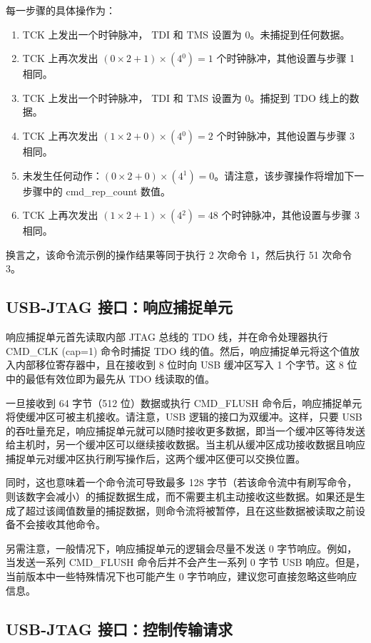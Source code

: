 \documentclass[main\_\_CN.tex]{subfiles}
\begin{document}
每一步骤的具体操作为：

\begin{enumerate}
\item TCK 上发出一个时钟脉冲， TDI 和 TMS 设置为 0。未捕捉到任何数据。
\item TCK 上再次发出 \((0\times2+1)\times(4{^0})=1\) 个时钟脉冲，其他设置与步骤 1 相同。
\item TCK 上发出一个时钟脉冲， TDI 和 TMS 设置为 0。捕捉到 TDO 线上的数据。
\item TCK 上再次发出 \((1\times2+0)\times(4{^0})=2\) 个时钟脉冲，其他设置与步骤 3 相同。
\item 未发生任何动作：\((0\times2+0)\times(4{^1})=0\)。请注意，该步骤操作将增加下一步骤中的 cmd\_rep\_count 数值。
\item TCK 上再次发出 \((1\times2+1)\times(4{^2})=48\) 个时钟脉冲，其他设置与步骤 3 相同。
\end{enumerate}

换言之，该命令流示例的操作结果等同于执行 2 次命令 1，然后执行 51 次命令 3。

\subsection{USB-JTAG 接口：响应捕捉单元}

响应捕捉单元首先读取内部 JTAG 总线的 TDO 线，并在命令处理器执行 CMD\_CLK (cap=1) 命令时捕捉 TDO 线的值。然后，响应捕捉单元将这个值放入内部移位寄存器中，且在接收到 8 位时向 USB 缓冲区写入 1 个字节。这 8 位中的最低有效位即为最先从 TDO 线读取的值。

一旦接收到 64 字节（512 位）数据或执行 CMD\_FLUSH 命令后，响应捕捉单元将使缓冲区可被主机接收。请注意，USB 逻辑的接口为双缓冲。这样，只要 USB 的吞吐量充足，响应捕捉单元就可以随时接收更多数据，即当一个缓冲区等待发送给主机时，另一个缓冲区可以继续接收数据。当主机从缓冲区成功接收数据且响应捕捉单元对缓冲区执行刷写操作后，这两个缓冲区便可以交换位置。

同时，这也意味着一个命令流可导致最多 128 字节（若该命令流中有刷写命令，则该数字会减小）的捕捉数据生成，而不需要主机主动接收这些数据。如果还是生成了超过该阈值数量的捕捉数据，则命令流将被暂停，且在这些数据被读取之前设备不会接收其他命令。

另需注意，一般情况下，响应捕捉单元的逻辑会尽量不发送 0 字节响应。例如，当发送一系列 CMD\_FLUSH 命令后并不会产生一系列 0 字节 USB 响应。但是，当前版本中一些特殊情况下也可能产生 0 字节响应，建议您可直接忽略这些响应信息。

\subsection{USB-JTAG 接口：控制传输请求}
\end{document}
